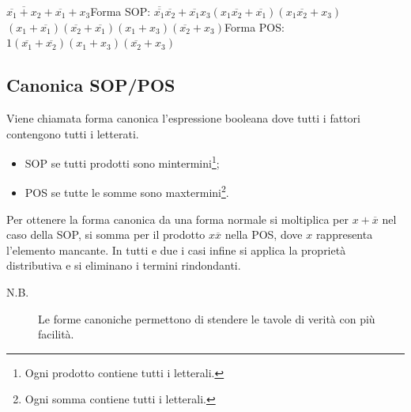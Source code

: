 \begin{example}
    $\overline{\overline{x_1}+x_2}+\overline{x_1}+x_3$\hspace{1cm}Forma SOP: $\overline{\overline{x_1}}\overline{x_2}+\overline{x_1}x_3$\hspace{1cm}$(x_1\overline{x_2}+\overline{x_1})(x_1\overline{x_2}+x_3)$\hspace{1cm}$(x_1+\overline{x_1})(\overline{x_2}+\overline{x_1})(x_1+x_3)(\overline{x_2}+x_3)$\hspace{1cm}Forma POS: $1(\overline{x_1}+\overline{x_2})(x_1+x_3)(\overline{x_2}+x_3)$
\end{example}

\subsection{Canonica SOP/POS}
Viene chiamata forma canonica l'espressione booleana dove tutti i fattori contengono tutti i letterati.
\begin{itemize}
    \item SOP se tutti prodotti sono mintermini\footnote{Ogni prodotto contiene tutti i letterali.};
    \item POS se tutte le somme sono maxtermini\footnote{Ogni somma contiene tutti i letterali.}.
\end{itemize}

Per ottenere la forma canonica da una forma normale si moltiplica per $x+\overline{x}$ nel caso della SOP, si somma per il prodotto $x\overline{x}$ nella POS, dove $x$ rappresenta l'elemento mancante. In tutti e due i casi infine si applica la proprietà distributiva e si eliminano i termini rindondanti.

\begin{description}
    \item[N.B.] Le forme canoniche permettono di stendere le tavole di verità con più facilità.
\end{description}

